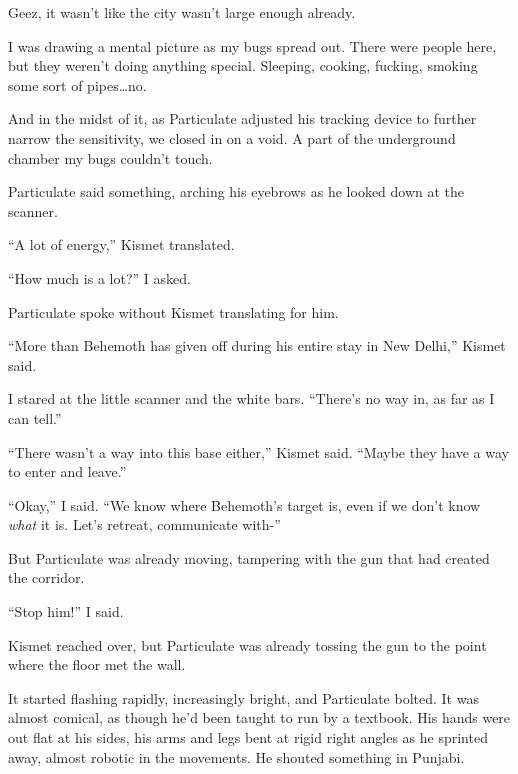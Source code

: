 Geez, it wasn't like the city wasn't large enough already.



I was drawing a mental picture as my bugs spread out.  There were people here, but they weren't doing anything special.  Sleeping, cooking, fucking, smoking some sort of pipes\ldots no.



And in the midst of it, as Particulate adjusted his tracking device to further narrow the sensitivity, we closed in on a void.  A part of the underground chamber my bugs couldn't touch.



Particulate said something, arching his eyebrows as he looked down at the scanner.



``A lot of energy,'' Kismet translated.



``How much is a lot?'' I asked.



Particulate spoke without Kismet translating for him.



``More than Behemoth has given off during his entire stay in New Delhi,'' Kismet said.



I stared at the little scanner and the white bars.  ``There's no way in, as far as I can tell.''



``There wasn't a way into this base either,'' Kismet said.  ``Maybe they have a way to enter and leave.''



``Okay,'' I said.  ``We know where Behemoth's target is, even if we don't know \emph{what} it is.  Let's retreat, communicate with-''



But Particulate was already moving, tampering with the gun that had created the corridor.



``Stop him!'' I said.



Kismet reached over, but Particulate was already tossing the gun to the point where the floor met the wall.



It started flashing rapidly, increasingly bright, and Particulate bolted.  It was almost comical, as though he'd been taught to run by a textbook.  His hands were out flat at his sides, his arms and legs bent at rigid right angles as he sprinted away, almost robotic in the movements.  He shouted something in Punjabi.




